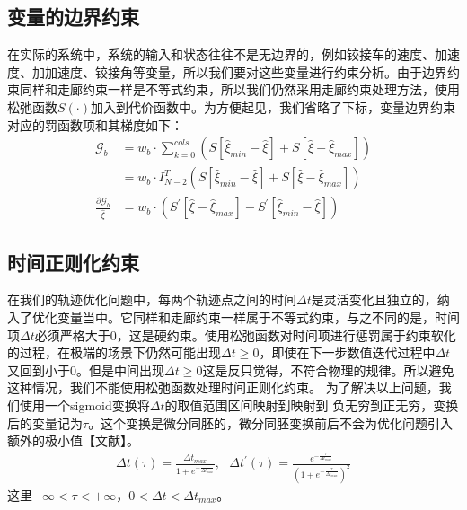 \documentclass[master,academic]{ysuthesis} %
\begin{document}
		\subsection{变量的边界约束}
		在实际的系统中，系统的输入和状态往往不是无边界的，例如铰接车的速度、加速度、加加速度、铰接角等变量，所以我们要对这些变量进行约束分析。由于边界约束同样和走廊约束一样是不等式约束，所以我们仍然采用走廊约束处理方法，使用松弛函数$S(\cdot)$加入到代价函数中。为方便起见，我们省略了下标，变量边界约束对应的罚函数项和其梯度如下：
		\begin{equation}
			\begin{aligned}
				\mathcal{G}_b&=w_b\cdot \sum_{k=0}^{cols}{\left( S\left[ \hat{\xi}_{min}-\hat{\xi} \right] +S\left[ \hat{\xi}-\hat{\xi}_{max} \right] \right)}\\
				&=w_b\cdot I_{N-2}^{T}\left( S\left[ \hat{\xi}_{min}-\hat{\xi} \right] +S\left[ \hat{\xi}-\hat{\xi}_{max} \right] \right)\\
				\frac{\partial \mathcal{G}_b}{\hat{\xi}}&=w_b\cdot \left( S^{'}\left[ \hat{\xi}-\hat{\xi}_{max} \right] -S^{'}\left[ \hat{\xi}_{min}-\hat{\xi} \right] \right)
			\end{aligned}
			\label{eq:Gb}
		\end{equation}

		\subsection{时间正则化约束}
		在我们的轨迹优化问题中，每两个轨迹点之间的时间$\Delta t$是灵活变化且独立的，纳入了优化变量当中。它同样和走廊约束一样属于不等式约束，与之不同的是，时间项$\Delta t$必须严格大于0，这是硬约束。使用松弛函数对时间项进行惩罚属于约束软化的过程，在极端的场景下仍然可能出现$\Delta t \ge 0$，即使在下一步数值迭代过程中$\Delta t$又回到小于0。但是中间出现$\Delta t \ge 0$这是反只觉得，不符合物理的规律。所以避免这种情况，我们不能使用松弛函数处理时间正则化约束。
		为了解决以上问题，我们使用一个sigmoid变换将$\Delta t$的取值范围区间映射到映射到 负无穷到正无穷，变换后的变量记为$\tau$。这个变换是微分同胚的，微分同胚变换前后不会为优化问题引入额外的极小值【文献】。
		\begin{equation}
			\begin{aligned}
				\Delta t\left( \tau \right) =\frac{\Delta t_{max}}{1+e^{-\frac{\tau}{\Delta t_{max}}}},\,\,\,\,\Delta t^{'}\left( \tau \right) =\frac{e^{-\frac{\tau}{\Delta t_{max}}}}{\left( 1+e^{-\frac{\tau}{\Delta t_{max}}} \right) ^2}
			\end{aligned}
		\end{equation}
		这里$-\infty <\tau <+\infty $，$0<\Delta t<\Delta t_{max}$。
		
\end{document}
